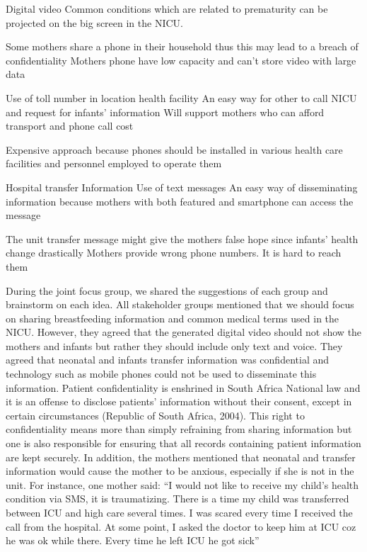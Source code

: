 Digital video
Common conditions which are related to prematurity can be projected on the big screen in the NICU.


Some mothers share a phone in their household thus this may lead to a breach of confidentiality 
Mothers phone have low capacity and can’t store video with large data

Use of toll number in location health facility
An easy way for other to call NICU and request for infants’ information
Will support mothers who can afford transport and phone call cost

Expensive approach because phones should be installed in various health care facilities and personnel employed to operate them

Hospital transfer Information
Use of text messages
An easy way of disseminating information because mothers with both featured and smartphone can access the message

The unit transfer message might give the mothers false hope since infants’ health change drastically
Mothers provide wrong phone numbers. It is hard to reach them

During the joint focus group, we shared the suggestions of each group and brainstorm on each idea. All stakeholder groups mentioned that we should focus on sharing breastfeeding information and common medical terms used in the NICU. However, they agreed that the generated digital video should not show the mothers and infants but rather they should include only text and voice. They agreed that neonatal and infants transfer information was confidential and technology such as mobile phones could not be used to disseminate this information. Patient confidentiality is enshrined in South Africa National law and it is an offense to disclose patients’ information without their consent, except in certain circumstances (Republic of South Africa, 2004). This right to confidentiality means more than simply refraining from sharing information but one is also responsible for ensuring that all records containing patient information are kept securely.  In addition, the mothers mentioned that neonatal and transfer information would cause the mother to be anxious, especially if she is not in the unit. For instance, one mother said:
“I would not like to receive my child’s health condition via SMS, it is traumatizing. There is a time my child was transferred between ICU and high care several times. I was scared every time I received the call from the hospital. At some point, I asked the doctor to keep him at ICU coz he was ok while there. Every time he left ICU he got sick”

